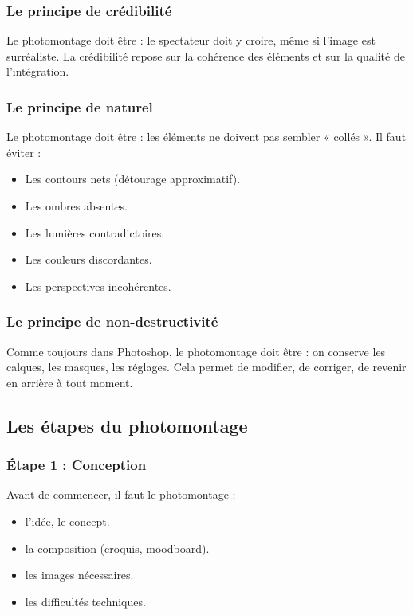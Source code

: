 \subsubsection{Le principe de crédibilité}

Le photomontage doit être  : le spectateur doit y croire, même si l'image est surréaliste. La crédibilité repose sur la cohérence des éléments et sur la qualité de l'intégration.

\subsubsection{Le principe de naturel}

Le photomontage doit être  : les éléments ne doivent pas sembler « collés ». Il faut éviter :

\begin{itemize}
    \item Les contours nets (détourage approximatif).
    \item Les ombres absentes.
    \item Les lumières contradictoires.
    \item Les couleurs discordantes.
    \item Les perspectives incohérentes.
\end{itemize}

\subsubsection{Le principe de non-destructivité}

Comme toujours dans Photoshop, le photomontage doit être  : on conserve les calques, les masques, les réglages. Cela permet de modifier, de corriger, de revenir en arrière à tout moment.

\subsection{Les étapes du photomontage}

\subsubsection{Étape 1 : Conception}

Avant de commencer, il faut  le photomontage :

\begin{itemize}
    \item {} l'idée, le concept.
    \item {} la composition (croquis, moodboard).
    \item {} les images nécessaires.
    \item {} les difficultés techniques.
\end{itemize}

